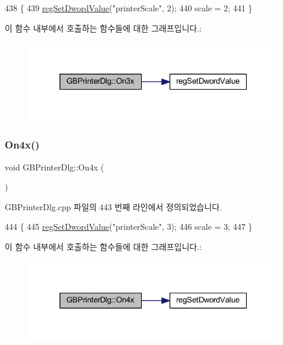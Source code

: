 \begin{DoxyCode}
438 \{
439   \mbox{\hyperlink{_reg_8cpp_a758e775489a3fb5c3cc7071fdd5af87e}{regSetDwordValue}}(\textcolor{stringliteral}{"printerScale"}, 2);
440   scale = 2;
441 \}
\end{DoxyCode}
이 함수 내부에서 호출하는 함수들에 대한 그래프입니다.\+:
\nopagebreak
\begin{figure}[H]
\begin{center}
\leavevmode
\includegraphics[width=316pt]{class_g_b_printer_dlg_ac3863f81d31a5d37a0369dab6bfbf87e_cgraph}
\end{center}
\end{figure}
\mbox{\label{class_g_b_printer_dlg_a36d0db8d85c1c2b70c3b9aa8b35c0026}} 
\subsubsection{\texorpdfstring{On4x()}{On4x()}}
{\footnotesize\ttfamily void G\+B\+Printer\+Dlg\+::\+On4x (\begin{DoxyParamCaption}{ }\end{DoxyParamCaption})\hspace{0.3cm}{\ttfamily [protected]}}



G\+B\+Printer\+Dlg.\+cpp 파일의 443 번째 라인에서 정의되었습니다.


\begin{DoxyCode}
444 \{
445   \mbox{\hyperlink{_reg_8cpp_a758e775489a3fb5c3cc7071fdd5af87e}{regSetDwordValue}}(\textcolor{stringliteral}{"printerScale"}, 3);
446   scale = 3;
447 \}
\end{DoxyCode}
이 함수 내부에서 호출하는 함수들에 대한 그래프입니다.\+:
\nopagebreak
\begin{figure}[H]
\begin{center}
\leavevmode
\includegraphics[width=316pt]{class_g_b_printer_dlg_a36d0db8d85c1c2b70c3b9aa8b35c0026_cgraph}
\end{center}
\end{figure}
\mbox{\label{class_g_b_printer_dlg_a0e1d0d5e238e3133e088bd1be4711755}} 

